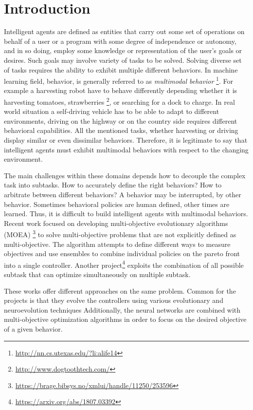 \documentclass[format=acmsmall, review=false, screen=true]{acmart}
\begin{document}
\section{Introduction}

Intelligent agents are defined as entities that carry out some set of operations on behalf of a user or a program with some degree of independence or autonomy, and in so doing, employ some knowledge or representation of the user's goals or desires. Such goals may involve variety of tasks to be solved. Solving diverse set of tasks requires the ability to exhibit multiple different behaviors. In machine learning field, behavior, is generally referred to as \emph{multimodal behavior} \footnote{\url{http://nn.cs.utexas.edu/?li:alife14}}. For example a harvesting robot have to behave differently depending whether it is harvesting tomatoes, strawberries \footnote{\url{http://www.dogtoothtech.com/}}, or searching for a dock to charge. In real world situation a self-driving vehicle has to be able to adapt to different environments, driving on the highway or on the country side requires different behavioral capabilities. All the mentioned tasks, whether harvesting or driving display similar or even dissimilar behaviors. Therefore, it is legitimate to say that intelligent agents must exhibit multimodal behaviors with respect to the changing environment.

The main challenges within these domains depends how to decouple the complex task into subtasks. How to accurately define the right behaviors? How to arbitrate between different behaviors? A behavior may be interrupted, by other behavior. Sometimes behavioral policies are human defined, other times are learned. Thus, it is difficult to build intelligent agents with multimodal behaviors. Recent work focused on developing multi-objective evolutionary algorithms (MOEA) \footnote{\url{https://brage.bibsys.no/xmlui/handle/11250/253596}} to solve multi-objective problems that are not explicitly defined as multi-objective. The algorithm attempts to define different ways to measure objectives and use ensembles to combine individual policies on the pareto front into a single controller. Another project\footnote{\url{https://arxiv.org/abs/1807.03392}} exploits the combination of all possible subtask that can optimize simultaneously on multiple subtask. 

These works offer different approaches on the same problem. Common for the projects is that they evolve the controllers using various evolutionary and neuroevolution techniques Additionally, the neural networks are combined with multi-objective optimization algorithms in order to focus on the desired objective of a given behavior.
\end{document}
